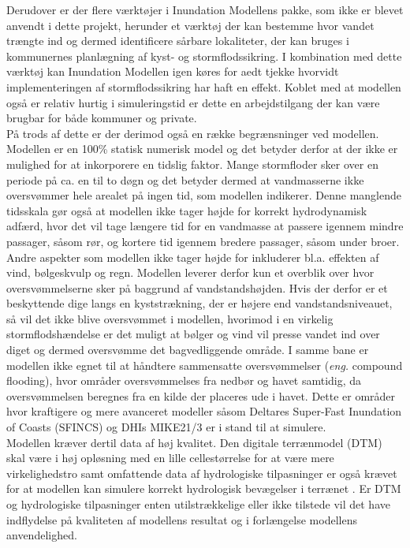 Derudover er der flere værktøjer i Inundation Modellens pakke, som ikke er blevet anvendt i dette projekt, herunder et værktøj der kan bestemme hvor vandet trængte ind og dermed identificere sårbare lokaliteter, der kan bruges i kommunernes planlægning af kyst- og stormflodssikring. I kombination med dette værktøj kan Inundation Modellen igen køres for aedt tjekke hvorvidt implementeringen af stormflodssikring har haft en effekt. Koblet med at modellen også er relativ hurtig i simuleringstid er dette en arbejdstilgang der kan være brugbar for både kommuner og private.\\


På trods af dette er der derimod også en række begrænsninger ved modellen. Modellen er en 100\% statisk numerisk model og det betyder derfor at der ikke er mulighed for at inkorporere en tidslig faktor. Mange stormfloder sker over en periode på ca. en til to døgn og det betyder dermed at vandmasserne ikke oversvømmer hele arealet på ingen tid, som modellen indikerer. Denne manglende tidsskala gør også at modellen ikke tager højde for korrekt hydrodynamisk adfærd, hvor det vil tage længere tid for en vandmasse at passere igennem mindre passager, såsom rør, og kortere tid igennem bredere passager, såsom under broer.\\

Andre aspekter som modellen ikke tager højde for inkluderer bl.a. effekten af vind, bølgeskvulp og regn. Modellen leverer derfor kun et overblik over hvor oversvømmelserne sker på baggrund af vandstandshøjden. Hvis der derfor er et beskyttende dige langs en kyststrækning, der er højere end vandstandsniveauet, så vil det ikke blive oversvømmet i modellen, hvorimod i en virkelig stormflodshændelse er det muligt at bølger og vind vil presse vandet ind over diget og dermed oversvømme det bagvedliggende område. I samme bane er modellen ikke egnet til at håndtere sammensatte oversvømmelser (\textit{eng.} compound flooding), hvor områder oversvømmelses fra nedbør og havet samtidig, da oversvømmelsen beregnes fra en kilde der placeres ude i havet. Dette er områder hvor kraftigere og mere avanceret modeller såsom Deltares Super-Fast Inundation of Coasts (SFINCS) og DHIs MIKE21/3 er i stand til at simulere.\\

Modellen kræver dertil data af høj kvalitet. Den digitale terrænmodel (DTM) skal være i høj opløsning med en lille cellestørrelse \citep{seenath_effects_2018, williams_geographic_2022} for at være mere virkelighedstro samt omfattende data af hydrologiske tilpasninger er også krævet for at modellen kan simulere korrekt hydrologisk bevægelser i terrænet \citep{bales_sources_2009}. Er DTM og hydrologiske tilpasninger enten utilstrækkelige eller ikke tilstede vil det have indflydelse på kvaliteten af modellens resultat og i forlængelse modellens anvendelighed. \\

